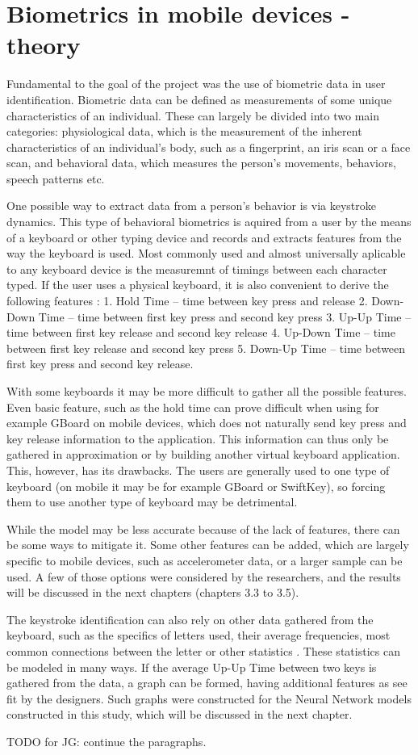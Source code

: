 
\chapter{Biometrics in mobile devices - theory}

Fundamental to the goal of the project was the use of biometric data in user identification. Biometric data can be defined as measurements of some unique characteristics of an individual. These can largely be divided into two main categories: physiological data, which is the measurement of the inherent characteristics of an individual's body, such as a fingerprint, an iris scan or a face scan, and behavioral data, which measures the person's movements, behaviors, speech patterns etc. \cite{Abde2023}

One possible way to extract data from a person's behavior is via keystroke dynamics. This type of behavioral biometrics is aquired from a user by the means of a keyboard or other typing device and records and extracts features from the way the keyboard is used. Most commonly used and almost universally aplicable to any keyboard device is the measuremnt of timings between each character typed. If the user uses a physical keyboard, it is also convenient to derive the following features \cite{Shar2023}:
1. Hold Time -- time between key press and release
2. Down-Down Time -- time between first key press and second key press
3. Up-Up Time -- time between first key release and second key release
4. Up-Down Time -- time between first key release and second key press
5. Down-Up Time -- time between first key press and second key release.

With some keyboards it may be more difficult to gather all the possible features. Even basic feature, such as the hold time can prove difficult when using for example GBoard on mobile devices, which does not naturally send key press and key release information to the application. This information can thus only be gathered in approximation or by building another virtual keyboard application. This, however, has its drawbacks. The users are generally used to one type of keyboard (on mobile it may be for example GBoard or SwiftKey), so forcing them to use another type of keyboard may be detrimental.

While the model may be less accurate because of the lack of features, there can be some ways to mitigate it. Some other features can be added, which are largely specific to mobile devices, such as accelerometer data, or a larger sample can be used. A few of those options were considered by the researchers, and the results will be discussed in the next chapters (chapters 3.3 to 3.5).

The keystroke identification can also rely on other data gathered from the keyboard, such as the specifics of letters used, their average frequencies, most common connections between the letter or other statistics \cite{Wang2024}. These statistics can be modeled in many ways. If the average Up-Up Time between two keys is gathered from the data, a graph can be formed, having additional features as see fit by the designers. Such graphs were constructed for the Neural Network models constructed in this study, which will be discussed in the next chapter.

TODO for JG: continue the paragraphs.
